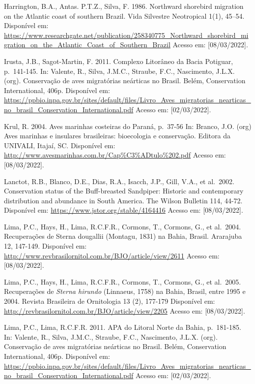 \documentclass[
  oneside]{scrbook}
\begin{document}
Harrington, B.A., Antas. P.T.Z., Silva, F. 1986. Northward shorebird migration on the Atlantic coast of southern Brazil. Vida Silvestre Neotropical 1(1), 45--54. Disponível em: \url{https://www.researchgate.net/publication/258340775_Northward_shorebird_migration_on_the_Atlantic_Coast_of_Southern_Brazil} Acesso em: {[}08/03/2022{]}.

Irusta, J.B., Sagot-Martin, F. 2011. Complexo Litorâneo da Bacia Potiguar, p.~141-145. In: Valente, R., Silva, J.M.C., Straube, F.C., Nascimento, J.L.X. (org). Conservação de aves migratórias neárticas no Brasil. Belém, Conservation International, 406p. Disponível em: \url{https://ppbio.inpa.gov.br/sites/default/files/Livro_Aves_migratorias_nearticas_no_brasil_Conservation_International.pdf} Acesso em: {[}02/03/2022{]}.

Krul, R. 2004. Aves marinhas costeiras do Paraná, p.~37-56 In: Branco, J.O. (org) Aves marinhas e insulares brasileiras: bioecologia e conservação. Editora da UNIVALI, Itajaí, SC. Disponível em: \url{http://www.avesmarinhas.com.br/Cap\%C3\%ADtulo\%202.pdf} Acesso em: {[}08/03/2022{]}.

Lanctot, R.B., Blanco, D.E., Dias, R.A., Isacch, J.P., Gill, V.A., et al.~2002. Conservation status of the Buff-breasted Sandpiper: Historic and contemporary distribution and abundance in South America. The Wilson Bulletin 114, 44-72. Disponível em: \url{https://www.jstor.org/stable/4164416} Acesso em: {[}08/03/2022{]}.

Lima, P.C., Hays, H., Lima, R.C.F.R., Cormons, T., Cormons, G., et al.~2004. Recuperações de Sterna dougallii (Montagu, 1831) na Bahia, Brasil. Ararajuba 12, 147-149. Disponível em: \url{http://www.revbrasilornitol.com.br/BJO/article/view/2611} Acesso em: {[}08/03/2022{]}.

Lima, P.C., Hays, H., Lima, R.C.F.R., Cormons, T., Cormons, G., et al.~2005. Recuperações de \emph{Sterna hirundo} (Linnaeus, 1758) na Bahia, Brasil, entre 1995 e 2004. Revista Brasileira de Ornitologia 13 (2), 177-179 Disponível em: \url{http://revbrasilornitol.com.br/BJO/article/view/2205} Acesso em: {[}08/03/2022{]}.

Lima, P.C., Lima, R.C.F.R. 2011. APA do Litoral Norte da Bahia, p.~181-185. In: Valente, R., Silva, J.M.C., Straube, F.C., Nascimento, J.L.X. (org). Conservação de aves migratórias neárticas no Brasil. Belém, Conservation International, 406p. Disponível em: \url{https://ppbio.inpa.gov.br/sites/default/files/Livro_Aves_migratorias_nearticas_no_brasil_Conservation_International.pdf} Acesso em: {[}02/03/2022{]}.
\end{document}
